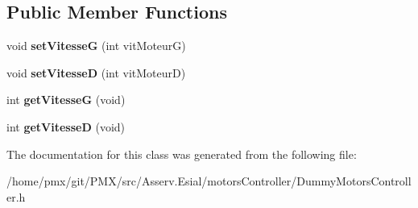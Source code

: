 \subsection*{Public Member Functions}
\begin{DoxyCompactItemize}
\item 
\mbox{\label{classDummyMotorsController_ae4d18e4fd9a47096e096607d9839ed1a}} 
void {\bfseries set\+VitesseG} (int vit\+MoteurG)
\item 
\mbox{\label{classDummyMotorsController_ac62d42a4cccf955024fe62286f873d21}} 
void {\bfseries set\+VitesseD} (int vit\+MoteurD)
\item 
\mbox{\label{classDummyMotorsController_a26180cc7975ed0db4d74025fedafc22d}} 
int {\bfseries get\+VitesseG} (void)
\item 
\mbox{\label{classDummyMotorsController_abbcbc5a74ac72012b9a90e7f92514e59}} 
int {\bfseries get\+VitesseD} (void)
\end{DoxyCompactItemize}


The documentation for this class was generated from the following file\+:\begin{DoxyCompactItemize}
\item 
/home/pmx/git/\+P\+M\+X/src/\+Asserv.\+Esial/motors\+Controller/Dummy\+Motors\+Controller.\+h\end{DoxyCompactItemize}
